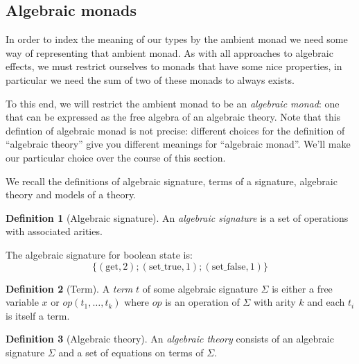 \documentclass[acmsmall, screen, nonacm]{acmart}
\theoremstyle{definition}
\newtheorem{definition}{Definition}[section]
\begin{document}
\subsection{Algebraic monads}

In order to index the meaning of our types by the ambient monad we need
some way of representing that ambient monad. As with all approaches to
algebraic effects, we must restrict ourselves to monads that have some
nice properties, in particular we need the sum of two of these monads to
always exists.

To this end, we will restrict the ambient monad to be an \emph{algebraic
  monad}: one that can be expressed as the free algebra of an algebraic
theory. Note that this defintion of algebraic monad is not precise:
different choices for the definition of ``algebraic theory'' give you
different meanings for ``algebraic monad''. We'll make our particular
choice over the course of this section.

We recall the definitions of algebraic signature, terms of a signature,
algebraic theory and models of a theory.
\begin{definition}[Algebraic signature]
  An \emph{algebraic signature} is a set of operations with associated
  arities.
\end{definition}

\begin{example}
  The algebraic signature for boolean state is:
  \begin{equation*}
    \{ (\mathrm{get}, 2); (\mathrm{set\_true}, 1); (\mathrm{set\_false}, 1) \}
  \end{equation*}
\end{example}

\begin{definition}[Term]
  A \emph{term} $t$ of some algebraic signature $\Sigma$ is either a
  free variable $x$ or $op(t_1, \ldots, t_k)$ where $op$ is an operation
  of $\Sigma$ with arity $k$ and each $t_i$ is itself a term.
\end{definition}

\begin{definition}[Algebraic theory]
  An \emph{algebraic theory} consists of an algebraic signature $\Sigma$ and a set of
  equations on terms of $\Sigma$.
\end{definition}
\end{document}
